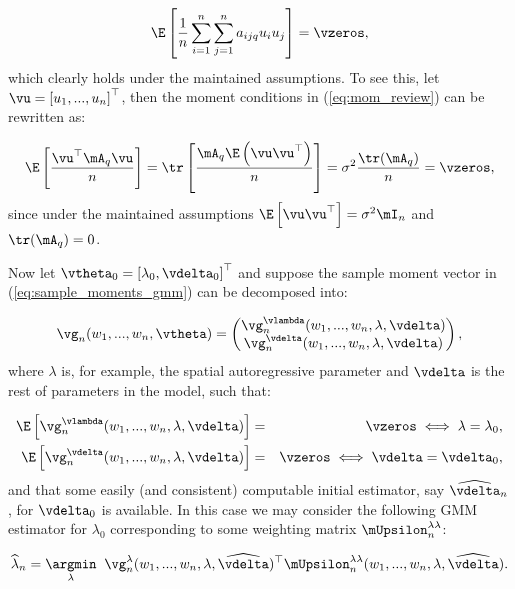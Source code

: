 \documentclass[english,12pt]{book}\usepackage[]{graphicx}\usepackage[]{xcolor}
\begin{document}
\begin{equation}\label{eq:mom_review}
	\E\left[\frac{1}{n}\sum_{i = 1}^n\sum_{j = 1} ^n a_{ijq}u_iu_j\right] = \vzeros,
\end{equation}
%
which clearly holds under the maintained assumptions. To see this, let $\vu = \left[u_1,...,u_n\right]^\top$, then the moment conditions in (\ref{eq:mom_review}) can be rewritten as:

\begin{equation*}
 \E\left[\frac{\vu^\top\mA_q\vu}{n}\right] = \tr\left[\frac{\mA_q\E\left(\vu\vu^\top\right)}{n}\right] = \sigma^2\frac{\tr(\mA_q)}{n} = \vzeros,
\end{equation*}
%
since under the maintained assumptions $\E\left[\vu\vu^\top\right] = \sigma^2\mI_n$ and $\tr(\mA_q) = 0$.

Now let $\vtheta_0 = \left[\lambda_0, \vdelta_0\right]^\top$ and suppose the sample moment vector in (\ref{eq:sample_moments_gmm}) can be decomposed into:

\begin{equation*}
\vg_n(w_1,...,w_n, \vtheta) = \begin{pmatrix}
\vg_n^{\vlambda}(w_1,...,w_n, \lambda, \vdelta) \\
\vg_n^{\vdelta}(w_1,...,w_n, \lambda, \vdelta) 
\end{pmatrix},
\end{equation*}
%
where $\lambda$ is, for example, the spatial autoregressive parameter and $\vdelta$ is the rest of parameters in the model, such that:

\begin{eqnarray*}
\E\left[\vg_n^{\vlambda}(w_1,...,w_n, \lambda, \vdelta)\right] &=& \vzeros \iff \lambda = \lambda_0,\\
\E\left[\vg_n^{\vdelta}(w_1,...,w_n, \lambda, \vdelta)\right] &=& \vzeros \iff \vdelta = \vdelta_0,
\end{eqnarray*}
%
and that some easily (and consistent) computable initial estimator, say $\widehat{\vdelta}_n$, for $\vdelta_0$ is available. In this case we may consider the following GMM estimator for $\lambda_0$ corresponding to some weighting matrix $\mUpsilon^{\lambda\lambda}_n$:

\begin{equation}\label{eq:gmm_two_step_a}
\widehat{\lambda}_n = \underset{\lambda}{\argmin}\;\;\vg_n^{\lambda}(w_1,...,w_n, \lambda, \widehat{\vdelta})^\top\mUpsilon^{\lambda\lambda}_n(w_1,...,w_n, \lambda, \widehat{\vdelta}).
\end{equation}
\end{document}
